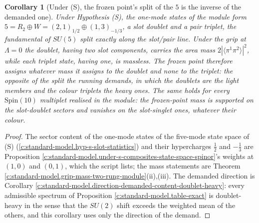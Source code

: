 \documentclass[11pt]{article}
\newtheorem{corollary}[theorem]{Corollary}
\theoremstyle{definition}
\theoremstyle{plain}
\newcommand{\changedmark}[2]{\marginpar{\raggedright\scriptsize\color{#1}#2}}
\providecommand{\br}{}\renewcommand{\br}[1]{\langle #1\rangle}
\begin{document}
\begin{corollary}[Under (S), the frozen point's split of the $5$ is the inverse of the demanded one]\label{c:standard-model.under-s-frozen-points-split-inverse}
\changedmark{gray}{reworded}
Under Hypothesis (S), the one-mode states of the module form $5 = R_{2} \oplus W = (2,1)_{1/2} \oplus (1,3)_{-1/3}$, a slot doublet and a pair triplet, the fundamental of $SU(5)$ split exactly along the slot/pair line. Under the grip at $\Lambda = 0$ the doublet, having two slot components, carries the area mass $2|\br{\pi^{1}\pi^{2}}|^{2}$, while each triplet state, having one, is massless. The frozen point therefore assigns whatever mass it assigns to the doublet and none to the triplet: the opposite of the split the running demands, in which the doublets are the light members and the colour triplets the heavy ones. The same holds for every $\mathrm{Spin}(10)$ multiplet realised in the module: the frozen-point mass is supported on the slot-doublet sectors and vanishes on the slot-singlet ones, whatever their colour.
\end{corollary}
\begin{proof}
The sector content of the one-mode states of the five-mode state space of (S) (\ref{c:standard-model.hyp-s-slot-statistics}) and their hypercharges $\tfrac12$ and $-\tfrac13$ are Proposition \ref{c:standard-model.under-s-composites-state-space-spinor}'s weights at $(1,0)$ and $(0,1)$, which the script lists; the mass statements are Theorem \ref{c:standard-model.grip-mass-two-rung-module}(ii),(iii). The demanded direction is Corollary \ref{c:standard-model.direction-demanded-content-doublet-heavy}: every admissible spectrum of Proposition \ref{c:standard-model.table-exact} is doublet-heavy in the sense that the $SU(2)$ shift exceeds the weighted mean of the others, and this corollary uses only the direction of the demand.

\end{proof}
\end{document}
